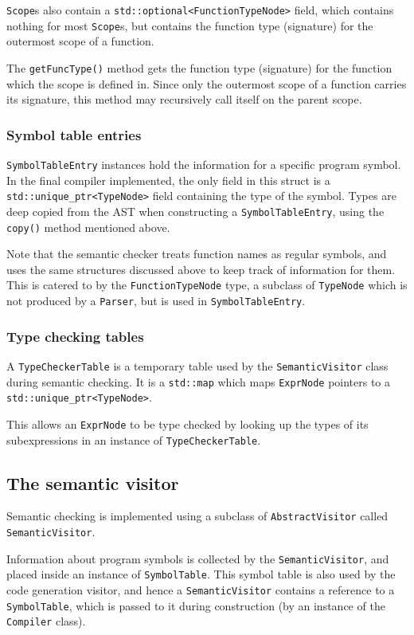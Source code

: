 \documentclass[11pt,a4paper]{scrartcl}
\begin{document}
\verb|Scope|s also contain a \verb|std::optional<FunctionTypeNode>| field, which contains nothing for most \verb|Scope|s, but contains the function type (signature) for the outermost scope of a function.

The \verb|getFuncType()| method gets the function type (signature) for the function which the scope is defined in. Since only the outermost scope of a function carries its signature, this method may recursively call itself on the parent scope.

\subsubsection{Symbol table entries}

\verb|SymbolTableEntry| instances hold the information for a specific program symbol. In the final compiler implemented, the only field in this struct is a \verb|std::unique_ptr<TypeNode>| field containing the type of the symbol. Types are deep copied from the AST when constructing a \verb|SymbolTableEntry|, using the \verb|copy()| method mentioned above.

Note that the semantic checker treats function names as regular symbols, and uses the same structures discussed above to keep track of information for them. This is catered to by the \verb|FunctionTypeNode| type, a subclass of \verb|TypeNode| which is not produced by a \verb|Parser|, but is used in \verb|SymbolTableEntry|.

\subsubsection{Type checking tables}

A \verb|TypeCheckerTable| is a temporary table used by the \verb|SemanticVisitor| class during semantic checking. It is a \verb|std::map| which maps \verb|ExprNode| pointers to a \verb|std::unique_ptr<TypeNode>|.

This allows an \verb|ExprNode| to be type checked by looking up the types of its subexpressions in an instance of \verb|TypeCheckerTable|.

\subsection{The semantic visitor}

Semantic checking is implemented using a subclass of \Verb|AbstractVisitor| called \Verb|SemanticVisitor|.

Information about program symbols is collected by the \Verb|SemanticVisitor|, and placed inside an instance of \Verb|SymbolTable|. This symbol table is also used by the code generation visitor, and hence a \Verb|SemanticVisitor| contains a reference to a \Verb|SymbolTable|, which is passed to it during construction (by an instance of the \verb|Compiler| class).
\end{document}
